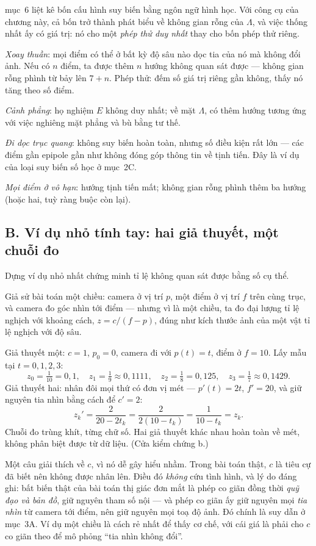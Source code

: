 \documentclass[../../vslam.tex]{subfiles}
\begin{document}
 mục~6 liệt kê bốn cấu hình suy biến bằng ngôn ngữ hình học. Với công cụ của chương này, cả bốn trở thành phát biểu về không gian rỗng của \(\Lambda\), và việc thống nhất ấy có giá trị: nó cho một \emph{phép thử duy nhất} thay cho bốn phép thử riêng.

\emph{Xoay thuần}: mọi điểm có thể ở bất kỳ độ sâu nào dọc tia của nó mà không đổi ảnh. Nếu có \(n\) điểm, ta được thêm \(n\) hướng không quan sát được --- không gian rỗng phình từ bảy lên \(7+n\). Phép thử: đếm số giá trị riêng gần không, thấy nó tăng theo số điểm.

\emph{Cảnh phẳng}: họ nghiệm \(E\) không duy nhất; về mặt \(\Lambda\), có thêm hướng tương ứng với việc nghiêng mặt phẳng và bù bằng tư thế.

\emph{Đi dọc trục quang}: không suy biến hoàn toàn, nhưng số điều kiện rất lớn --- các điểm gần epipole gần như không đóng góp thông tin về tịnh tiến. Đây là ví dụ của loại suy biến số học ở mục~2C.

\emph{Mọi điểm ở vô hạn}: hướng tịnh tiến mất; không gian rỗng phình thêm ba hướng (hoặc hai, tuỳ ràng buộc còn lại).

\subsection{B. Ví dụ nhỏ tính tay: hai giả thuyết, một chuỗi đo}

Dựng ví dụ nhỏ nhất chứng minh tỉ lệ không quan sát được bằng số cụ thể.

Giả sử bài toán một chiều: camera ở vị trí \(p\), một điểm ở vị trí \(f\) trên cùng trục, và camera đo góc nhìn tới điểm --- nhưng vì là một chiều, ta đo đại lượng tỉ lệ nghịch với khoảng cách, \(z = c/(f - p)\), đúng như kích thước ảnh của một vật tỉ lệ nghịch với độ sâu.

Giả thuyết một: \(c = 1\), \(p_0 = 0\), camera đi với \(p(t) = t\), điểm ở \(f = 10\). Lấy mẫu tại \(t = 0,1,2,3\):
\[
z_0 = \tfrac{1}{10} = 0{,}1,\quad
z_1 = \tfrac{1}{9} \approx 0{,}1111,\quad
z_2 = \tfrac{1}{8} = 0{,}125,\quad
z_3 = \tfrac{1}{7} \approx 0{,}1429 .
\]
Giả thuyết hai: nhân đôi mọi thứ có đơn vị mét --- \(p'(t) = 2t\), \(f' = 20\), và giữ nguyên tia nhìn bằng cách để \(c' = 2\):
\[
z_k' = \frac{2}{20 - 2t_k} = \frac{2}{2(10-t_k)} = \frac{1}{10-t_k} = z_k .
\]
Chuỗi đo trùng khít, từng chữ số. Hai giả thuyết khác nhau hoàn toàn về mét, không phân biệt được từ dữ liệu. (Cửa kiểm chứng b.)

Một câu giải thích về \(c\), vì nó dễ gây hiểu nhầm. Trong bài toán thật, \(c\) là tiêu cự đã biết nên không được nhân lên. Điều đó \emph{không} cứu tình hình, và lý do đáng ghi: bất biến thật của bài toán thị giác đơn mắt là phép co giãn đồng thời \emph{quỹ đạo và bản đồ}, giữ nguyên tham số nội --- và phép co giãn ấy giữ nguyên mọi \emph{tia nhìn} từ camera tới điểm, nên giữ nguyên mọi toạ độ ảnh. Đó chính là suy dẫn ở mục~3A. Ví dụ một chiều là cách rẻ nhất để thấy cơ chế, với cái giá là phải cho \(c\) co giãn theo để mô phỏng ``tia nhìn không đổi''.
\end{document}
